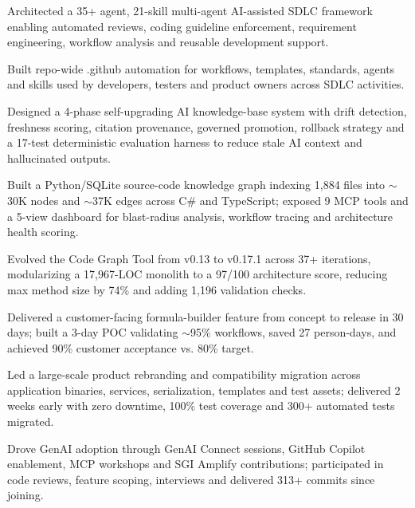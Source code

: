 \documentclass{resume}
\begin{document}
\begin{tightemize}
\item Architected a 35+ agent, 21-skill multi-agent AI-assisted SDLC framework enabling automated reviews, coding guideline enforcement, requirement engineering, workflow analysis and reusable development support.
\item Built repo-wide .github automation for workflows, templates, standards, agents and skills used by developers, testers and product owners across SDLC activities.
\item Designed a 4-phase self-upgrading AI knowledge-base system with drift detection, freshness scoring, citation provenance, governed promotion, rollback strategy and a 17-test deterministic evaluation harness to reduce stale AI context and hallucinated outputs.
\end{tightemize}
\entryspace

\begin{tightemize}
\item Built a Python/SQLite source-code knowledge graph indexing 1,884 files into $\sim$30K nodes and $\sim$37K edges across C\# and TypeScript; exposed 9 MCP tools and a 5-view dashboard for blast-radius analysis, workflow tracing and architecture health scoring.
\item Evolved the Code Graph Tool from v0.13 to v0.17.1 across 37+ iterations, modularizing a 17,967-LOC monolith to a 97/100 architecture score, reducing max method size by 74\% and adding 1,196 validation checks.
\item Delivered a customer-facing formula-builder feature from concept to release in 30 days; built a 3-day POC validating $\sim$95\% workflows, saved 27 person-days, and achieved 90\% customer acceptance vs. 80\% target.
\item Led a large-scale product rebranding and compatibility migration across application binaries, services, serialization, templates and test assets; delivered 2 weeks early with zero downtime, 100\% test coverage and 300+ automated tests migrated.
\item Drove GenAI adoption through GenAI Connect sessions, GitHub Copilot enablement, MCP workshops and SGI Amplify contributions; participated in code reviews, feature scoping, interviews and delivered 313+ commits since joining.
\end{tightemize}
\end{document}
